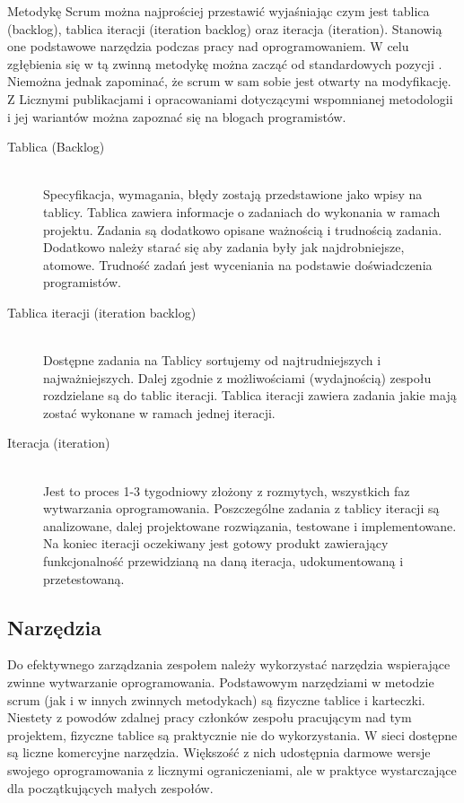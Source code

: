 Metodykę Scrum można najprościej przestawić wyjaśniając czym jest tablica (backlog), tablica iteracji (iteration backlog) oraz iteracja (iteration). Stanowią one podstawowe narzędzia podczas pracy nad oprogramowaniem. W celu zgłębienia się w tą zwinną metodykę można zacząć od standardowych pozycji \cite{scrumalliance} \cite{scrum_wiki}. Niemożna jednak zapominać, że scrum w sam sobie jest otwarty na modyfikację. Z Licznymi publikacjami i opracowaniami dotyczącymi wspomnianej metodologii i jej wariantów można zapoznać się na blogach programistów.  

\begin{description}

\item[Tablica (Backlog)]\hfill\\
Specyfikacja, wymagania, błędy zostają przedstawione jako wpisy na tablicy. Tablica zawiera informacje o zadaniach do wykonania w ramach projektu. Zadania są dodatkowo opisane ważnością i trudnością zadania. Dodatkowo należy starać się aby zadania były jak najdrobniejsze, atomowe. Trudność zadań jest wyceniania na podstawie doświadczenia programistów.

\item[Tablica iteracji (iteration backlog)]\hfill\\
Dostępne zadania na Tablicy sortujemy od najtrudniejszych i najważniejszych. Dalej zgodnie z możliwościami (wydajnością) zespołu rozdzielane są do tablic iteracji. Tablica iteracji zawiera zadania jakie mają zostać wykonane w ramach jednej iteracji. 

\item[Iteracja (iteration)]\hfill\\
Jest to proces 1-3 tygodniowy złożony z rozmytych, wszystkich faz wytwarzania oprogramowania. Poszczególne zadania z tablicy iteracji są analizowane, dalej projektowane rozwiązania, testowane i implementowane. Na koniec iteracji oczekiwany jest gotowy produkt zawierający funkcjonalność przewidzianą na daną iteracja, udokumentowaną i przetestowaną.

\end{description}

\subsection{Narzędzia}

Do efektywnego zarządzania zespołem należy wykorzystać narzędzia wspierające zwinne wytwarzanie oprogramowania. Podstawowym narzędziami w metodzie scrum (jak i w innych zwinnych metodykach) są fizyczne tablice i karteczki. Niestety z powodów zdalnej pracy członków zespołu pracującym nad tym projektem, fizyczne tablice są praktycznie nie do wykorzystania. W sieci dostępne są liczne komercyjne narzędzia. Większość z nich udostępnia darmowe wersje swojego oprogramowania z licznymi ograniczeniami, ale w praktyce wystarczające dla początkujących małych zespołów.  

